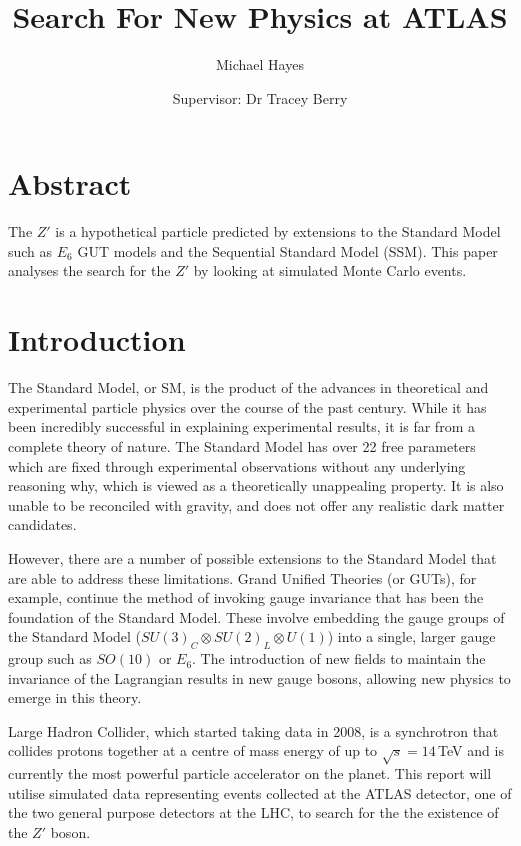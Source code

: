 \documentclass{article}
\title{Search For New Physics at ATLAS}
\author{Michael Hayes}
\date{Supervisor: Dr Tracey Berry}
\begin{document}
\maketitle
\large
\onehalfspacing
\section*{Abstract}
\addtocounter{section}{1}
The $Z'$ is a hypothetical particle predicted by extensions to the Standard Model such as $E_6$ GUT models and the Sequential Standard Model (SSM). This paper analyses the search for the $Z'$ by looking at simulated Monte Carlo events.

\clearpage
\normalsize
\tableofcontents
\clearpage
\large
\section{Introduction}%
\label{sec:Introduction}
The Standard Model, or SM, is the product of the advances in theoretical and experimental particle physics over the course of the past century. While it has been incredibly successful in explaining experimental results, it is far from a complete theory of nature. The Standard Model has over 22 free parameters which are fixed through experimental observations without any underlying reasoning why, which is viewed as a theoretically unappealing property. It is also unable to be reconciled with gravity, and does not offer any realistic dark matter candidates. 

However, there are a number of possible extensions to the Standard Model that are able to address these limitations. Grand Unified Theories (or GUTs), for example, continue the method of invoking gauge invariance that has been the foundation of the Standard Model. These involve embedding the gauge groups of the Standard Model ($SU(3)_C \otimes SU(2)_L \otimes U(1)$) into a single, larger gauge group such as $SO(10)$ or $E_6$. The introduction of new fields to maintain the invariance of the Lagrangian results in new gauge bosons, allowing new physics to emerge in this theory.

Large Hadron Collider, which started taking data in 2008, is a synchrotron that collides protons together at a centre of mass energy of up to $\sqrt{s} = 14\,$TeV and is currently the most powerful particle accelerator on the planet. This report will utilise simulated data representing events collected at the ATLAS detector, one of the two general purpose detectors at the LHC, to search for the the existence of the $Z'$ boson.
\end{document}

